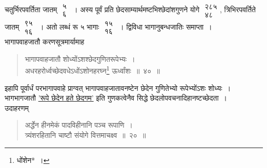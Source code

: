 \documentclass[10pt, openany]{book}
\begin{document}
{चतुर्भिरपवर्तिता जातम् $\begin{matrix}

\mbox{{५}}\\

\mbox{{६}}

\end{matrix}$~। अस्य पूर्वं प्रति
छेदसाम्यार्थमष्टभिश्छेदांशगुणने योगे $\begin{matrix}

\mbox{{२८५}}\\

\mbox{{४८}}

\end{matrix}$,}
{त्रिभिरपवर्तिते जातम् $\begin{matrix}

\mbox{{९५}}\\

\mbox{{१६}}

\end{matrix}$~। अतो लब्धं रू ५ भागाः $\begin{matrix}

\mbox{{१५}}\\

\mbox{{१६}}

\end{matrix}$~।
द्विविधा भागानुबन्धजातिः समाप्ता~।}\\

{भागापवाहजातौ करणसूत्रमार्यामाह\textemdash}

 \label{40}
\begin{quote}
    
{\bs भागापवाहजातौ शोध्योंऽशश्छेदगुणितरूपेभ्यः~। \\
 अधरहरोर्ध्वच्छेदवधेऽधोंऽशोनहरघ्न\renewcommand{\thefootnote}{\s ३}\footnote{\s *धोंशेन*~।} ऊर्ध्वांशः~॥~४०~॥}\end{quote} 

{इहापि पूर्वार्धं परभागापवाहे प्राग्वत् भागापवाहजातावनष्टेन छेदेन
गुणितेभ्यो रूपेभ्योंऽशः शोध्यः~। भागभागजातौ \hyperref[38]{'रूपे छेदेन हते छेदगम'} इति गुणकत्वेनैव
सिद्धे छेदलोपवचनादिहानष्टच्छेदता~।}\\

{उदाहरणम्\textemdash}

\begin{quote}
{\eg अर्द्धेन हीनमेकं पादविहीनानि पञ्च रूपाणि~। \\
 त्र्यंशरहितानि चाष्टौ संयोगे वित्तमाचक्ष्व~॥~२०~॥}\end{quote}
\end{document}
